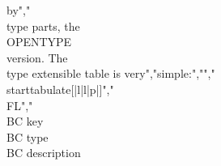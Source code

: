 by","\\type {parts}, the \\OPENTYPE\\ version. The \\type {extensible} table is very","simple:","","\\starttabulate[|l|l|p|]","\\FL","\\BC key        \\BC type   \\BC description                \\